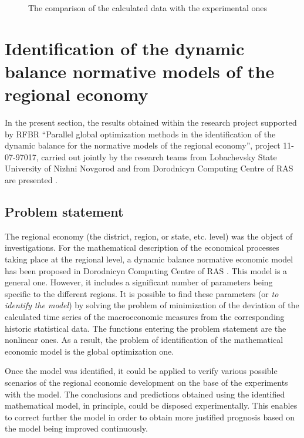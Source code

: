 \begin{figure}
\begin{minipage}{0.5\linewidth}
\end{minipage}
\caption{The comparison of the calculated data with the experimental ones}
\label{8_fig_6}
\end{figure}


\section{Identification of the dynamic balance normative models of the regional economy}

In the present section, the results obtained within the research project supported by RFBR ``Parallel global optimization methods in the identification of the dynamic balance for the normative models of the regional economy'', project 11-07-97017, carried out jointly by the research teams from Lobachevsky State University of Nizhni Novgorod and from Dorodnicyn Computing Centre of RAS are presented \cite{8_Gergel2011}.

\subsection{Problem statement}

The regional economy (the district, region, or state, etc. level) was the object of investigations. For the mathematical description of the economical processes taking place at the regional level, a dynamic balance normative economic model has been proposed in Dorodnicyn Computing Centre of RAS \cite{8_Olenev1999}. This model is a general one. However, it includes a significant number of parameters  being specific to the different regions. It is possible to find these parameters (or \textit{to identify the model}) by solving the problem of minimization of the deviation of the calculated time series of the macroeconomic measures from the corresponding historic statistical data. The functions entering the problem statement are the nonlinear ones. As a result, the problem of identification of the mathematical economic model is the global optimization one.

Once the model was identified, it could be applied to verify various possible scenarios of the regional economic development on the base of the experiments with the model. The conclusions and predictions obtained using the identified mathematical model, in principle, could be disposed experimentally. This enables to correct further the model in order to obtain more justified prognosis based on the model being improved continuously. 

